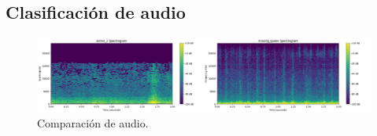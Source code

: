 \subsection{Clasificación de audio}

\begin{figure}[H]
  \centering
  \includegraphics[width=\textwidth]{assets/cap_3/comparacion_audio.png}
  \caption{Comparación de audio.}
  \label{fig:comparacion_audio}
\end{figure}